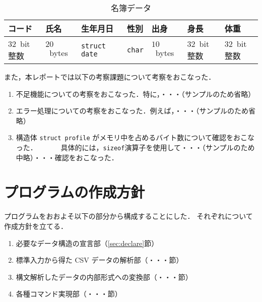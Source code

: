 \documentclass[a4j,11pt]{jarticle}
\begin{document}
\begin{table}[t]
\centering %
    \caption{名簿データ}
    \label{tbl:structure_person}
    \begin{tabular}{|l|l|l|l|l|l|l|}
        \hline
        コード & 氏名 & 生年月日 & 性別 & 出身 & 身長 & 体重\\
        \hline
        $32$~bit整数 & $20$~bytes & \verb|struct date|
        & \verb|char| & $10$~bytes & $32$~bit整数 & $32$~bit整数\\
        \hline
    \end{tabular}
\end{table}

また，本レポートでは以下の考察課題について考察をおこなった．

\begin{enumerate}
\setlength{\parskip}{2pt}\setlength{\itemsep}{2pt}%
    \item 不足機能についての考察をおこなった．特に，・・・（サンプルのため省略）
    \item エラー処理についての考察をおこなった．例えば，・・・（サンプルのため省略）
    \item 構造体 \verb|struct profile| がメモリ中を占めるバイト数について確認をおこなった．
       　　　具体的には，\verb|sizeof|演算子を使用して・・・（サンプルのため中略）・・・確認をおこなった．
\end{enumerate}

\section{プログラムの作成方針}


プログラムをおおよそ以下の部分から構成することにした．
それぞれについて作成方針を立てる．

\begin{enumerate}
\setlength{\parskip}{2pt} \setlength{\itemsep}{2pt}
    \item 必要なデータ構造の宣言部（\ref{sec:declare}節）
    \item 標準入力から得た CSV データの解析部（・・・節）
    \item 構文解析したデータの内部形式への変換部（・・・節）
    \item 各種コマンド実現部（・・・節）
\end{enumerate}
\end{document}
